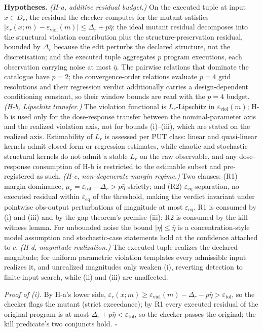 \documentclass[manuscript,screen,review]{acmart}
\begin{document}
\textbf{Hypotheses.} \emph{(H-a, additive residual budget.)} On the
executed tuple at input $x \in D_r$, the residual the checker computes
for the mutant satisfies
$|\varepsilon_r(x; m) - \varepsilon_{\mathrm{viol}}(m)| \leq \Delta_r + p\bar\eta$:
the ideal mutant residual decomposes into the structural violation
contribution plus the structure-preservation residual, bounded by
$\Delta_r$ because the edit perturbs the declared structure, not the
discretisation; and the executed tuple aggregates $p$ program
executions, each observation carrying noise at most $\bar\eta$. The
pairwise relations that dominate the catalogue have $p = 2$; the
convergence-order relations evaluate $p = 4$ grid resolutions and their
regression verdict additionally carries a design-dependent conditioning
constant, so their window bounds are read with the $p = 4$ budget.
\emph{(H-b, Lipschitz transfer.)} The violation functional is
$L_r$-Lipschitz in $\varepsilon_{\mathrm{viol}}(m)$; H-b is used only
for the dose-response transfer between the nominal-parameter axis and
the realized violation axis, not for bounds (i)--(iii), which are
stated on the realized axis. Estimability of $L_r$ is assessed per PUT
class: linear and quasi-linear kernels admit closed-form or regression
estimates, while chaotic and stochastic-structural kernels do not admit
a stable $L_r$ on the raw observable, and any dose-response consumption
of H-b is restricted to the estimable subset and pre-registered as
such. \emph{(H-c, non-degenerate-margin regime.)} Two clauses: (R1)
margin dominance,
$\mu_r = \varepsilon_{\mathrm{tol}} - \Delta_r > p\bar\eta$ strictly;
and (R2) $\varepsilon_{\mathrm{eq}}$-separation, no executed residual
within $\varepsilon_{\mathrm{eq}}$ of the threshold, making the verdict
invariant under pointwise obs-output perturbations of magnitude at most
$\varepsilon_{\mathrm{eq}}$. R1 is consumed by (i) and (iii) and by the
gap theorem's premise (iii); R2 is consumed by the kill-witness lemma.
For unbounded noise the bound $|\eta| \leq \bar\eta$ is a
concentration-style model assumption and stochastic-case statements
hold at the confidence attached to $c$. \emph{(H-d, magnitude
realization.)} The executed tuple realizes the declared magnitude; for
uniform parametric violation templates every admissible input realizes
it, and unrealized magnitudes only weaken (i), reverting detection to
finite-input search, while (ii) and (iii) are unaffected.

\emph{Proof of (i).} By H-a's lower side,
$\varepsilon_r(x; m) \geq \varepsilon_{\mathrm{viol}}(m) - \Delta_r - p\bar\eta > \varepsilon_{\mathrm{tol}}$,
so the checker flags the mutant (strict exceedance); by R1 every
executed residual of the original program is at most
$\Delta_r + p\bar\eta < \varepsilon_{\mathrm{tol}}$, so the checker
passes the original; the kill predicate's two conjuncts hold. $\square$
\end{document}

